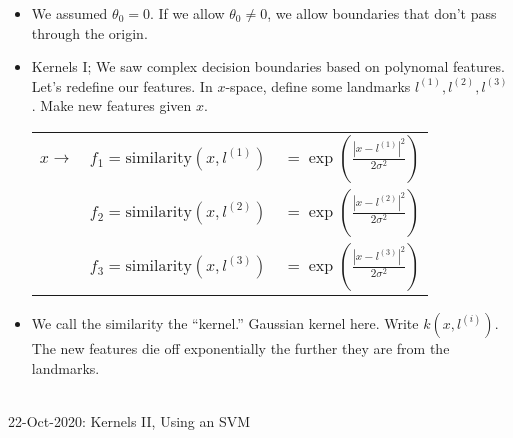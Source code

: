 \documentclass[10pt]{article}
\begin{document}
\begin{itemize}
  \item We assumed $\theta_0 = 0$. If we allow $\theta_0 \neq 0$, we allow boundaries that don't pass through the origin.
  \item Kernels I; We saw complex decision boundaries based on polynomal features. Let's redefine our features. In $x$-space, define some landmarks $l^{(1)},l^{(2)},l^{(3)}$. Make new features given $x$. \\
    \begin{center}
      \begin{tabular}{c c c}
        $x \rightarrow$ & $f_1 = \text{similarity}(x, l^{(1)})$ & $= \exp \left( \frac{ \left| x - l^{(1)} \right|^2}{2 \sigma^2 }\right)$ \\
                        & $f_2 = \text{similarity}(x, l^{(2)})$ & $= \exp \left( \frac{ \left| x - l^{(2)} \right|^2}{2 \sigma^2 }\right)$ \\
                        & $f_3 = \text{similarity}(x, l^{(3)})$ & $= \exp \left( \frac{ \left| x - l^{(3)} \right|^2}{2 \sigma^2 }\right)$
      \end{tabular}
    \end{center}
  \item We call the similarity the ``kernel.'' Gaussian kernel
    here. Write $k(x, l^{(i)})$. The new features die off
    exponentially the further they are from the landmarks.
\end{itemize}
\hfill \\
{\large 22-Oct-2020: Kernels II, Using an SVM}
\end{document}
